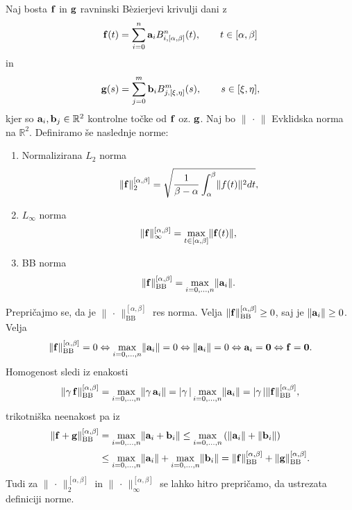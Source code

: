 \documentclass[12pt,a4paper, reqno]{amsart}
\def\R{\mathbb R}
\begin{document}
Naj bosta ${\bf f}$ in ${\bf g}$ ravninski B\`{e}zierjevi krivulji dani z 
$${\bf f}(t) = \sum _{i=0}^{n} {\bf a}_i B_{i,[\alpha,\beta]}^n(t), \qquad t\in[\alpha,\beta]$$
in
$${\bf g}(s) = \sum _{j=0}^{m} {\bf b}_i B_{j,[\xi,\eta]}^m(s), \qquad s\in[\xi,\eta],$$
kjer so ${\bf a}_i, {\bf b}_j \in \R ^2$ kontrolne točke od ${\bf f}$ oz. ${\bf g}$. Naj bo $\lVert \,\cdot\,\rVert$ Evklidska norma na $\R^2$. Definiramo še naslednje norme:
\begin{enumerate}
\item Normalizirana $L_2$ norma
$$
\lVert {\bf f} \rVert _2^{[\alpha,\beta]} = \sqrt{\frac{1}{\beta -\alpha}\int _{\alpha}^{\beta}\lVert {\bf} f(t)\rVert ^2 dt},
$$
\item $L_{\infty}$ norma
$$
\lVert {\bf f} \rVert _\infty^{[\alpha,\beta]} = \max _{t\in[\alpha,\beta]} \lVert {\bf f}(t)\rVert,
$$
\item BB norma
$$
\lVert {\bf f} \rVert _{\text{BB}}^{[\alpha,\beta]} = \max _{i=0,\ldots,n} \lVert {\bf a}_i\rVert.
$$
\end{enumerate}
Prepričajmo se, da je $\lVert \,\cdot\, \rVert _{\text{BB}}^{[\alpha,\beta]}$ res norma. Velja $\lVert {\bf f} \rVert _{\text{BB}}^{[\alpha,\beta]} \geq 0$, saj je $\lVert {\bf a}_i\rVert \geq 0$. Velja 
\begin{equation*}
\lVert {\bf f} \rVert _{\text{BB}}^{[\alpha,\beta]} = 0  \Leftrightarrow 
\max _{i=0,\ldots,n} \lVert {\bf a}_i\rVert = 0 
 \Leftrightarrow \lVert {\bf a}_i\rVert = 0 \Leftrightarrow {\bf a}_i = {\bf 0 }
 \Leftrightarrow {\bf f} = {\bf 0}.
\end{equation*}
Homogenost sledi iz enakosti 
\begin{equation*}
\lVert \gamma\, {\bf f} \rVert _{\text{BB}}^{[\alpha,\beta]}  = 
\max _{i=0,\ldots,n} \lVert \gamma\, {\bf a}_i\rVert = 
 |\gamma\, | \max _{i=0,\ldots,n}  \lVert {\bf a}_i\rVert = 
 |\gamma\,| \lVert {\bf f} \rVert _{\text{BB}}^{[\alpha,\beta]},
\end{equation*}
trikotniška neenakost pa iz 
\begin{equation*}
\begin{split}
\lVert {\bf f} + {\bf g} \rVert _{\text{BB}}^{[\alpha,\beta]} &= 
\max _{i=0,\ldots,n} \lVert {\bf a}_i + {\bf b}_i \rVert 
\leq \max _{i=0,\ldots,n} \left ( \lVert {\bf a}_i\rVert + \lVert {\bf b}_i \rVert\right ) \\
& \leq \max _{i=0,\ldots,n} \lVert {\bf a}_i\rVert + 
\max _{i=0,\ldots,n} \lVert {\bf b}_i \rVert = 
\lVert {\bf f} \rVert _{\text{BB}}^{[\alpha,\beta]} +
\lVert {\bf g} \rVert _{\text{BB}}^{[\alpha,\beta]}.
\end{split}
\end{equation*}
Tudi za $\lVert \,\cdot\, \rVert _2^{[\alpha,\beta]}$ in $\lVert \,\cdot\, \rVert _\infty^{[\alpha,\beta]}$ se lahko hitro prepričamo, da ustrezata definiciji norme.

\end{document}

